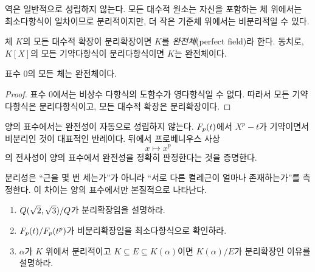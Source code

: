 역은 일반적으로 성립하지 않는다. 모든 대수적 원소는 자신을 포함하는 체 위에서는 최소다항식이 일차이므로 분리적이지만, 더 작은 기준체 위에서는 비분리적일 수 있다.

\begin{definition}[완전체]
체 $K$의 모든 대수적 확장이 분리확장이면 $K$를 \emph{완전체}(perfect field)라 한다. 동치로, $K[X]$의 모든 기약다항식이 분리다항식이면 $K$는 완전체이다.
\end{definition}

\begin{theorem}
표수 $0$의 모든 체는 완전체이다.
\end{theorem}

\begin{proof}
표수 $0$에서는 비상수 다항식의 도함수가 영다항식일 수 없다. 따라서 모든 기약다항식은 분리다항식이고, 모든 대수적 확장은 분리확장이다.
\end{proof}

양의 표수에서는 완전성이 자동으로 성립하지 않는다. $F_p(t)$에서 $X^p-t$가 기약이면서 비분리인 것이 대표적인 반례이다. 뒤에서 프로베니우스 사상
\[
  x\longmapsto x^p
\]
의 전사성이 양의 표수에서 완전성을 정확히 판정한다는 것을 증명한다.

\begin{keyidea}
분리성은 ``근을 몇 번 세는가''가 아니라 ``서로 다른 켤레근이 얼마나 존재하는가''를 측정한다. 이 차이는 양의 표수에서만 본질적으로 나타난다.
\end{keyidea}

\begin{checkpoint}
\begin{enumerate}[label=(\alph*)]
  \item $Q(\sqrt2,\sqrt3)/Q$가 분리확장임을 설명하라.
  \item $F_p(t)/F_p(t^p)$가 비분리확장임을 최소다항식으로 확인하라.
  \item $\alpha$가 $K$ 위에서 분리적이고 $K\subseteq E\subseteq K(\alpha)$이면 $K(\alpha)/E$가 분리확장인 이유를 설명하라.
\end{enumerate}
\end{checkpoint}
